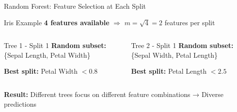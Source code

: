 \documentclass[8pt]{beamer}
\begin{document}
\begin{frame}{Random Forest: Feature Selection at Each Split}
\begin{examplebox}{Iris Example}
\textbf{4 features available} $\Rightarrow$ $m = \sqrt{4} = 2$ features per split
\end{examplebox}

\begin{columns}
\begin{column}{0.48\textwidth}
\begin{definitionbox}{Tree 1 - Split 1}
\textbf{Random subset:} \{Sepal Length, Petal Width\}

\textbf{Best split:} Petal Width $< 0.8$
\end{definitionbox}
\end{column}

\begin{column}{0.48\textwidth}
\begin{definitionbox}{Tree 2 - Split 1}
\textbf{Random subset:} \{Sepal Width, Petal Length\}

\textbf{Best split:} Petal Length $< 2.5$
\end{definitionbox}
\end{column}
\end{columns}

\begin{keypointsbox}
\textbf{Result:} Different trees focus on different feature combinations → Diverse predictions
\end{keypointsbox}
\end{frame}
\end{document}
